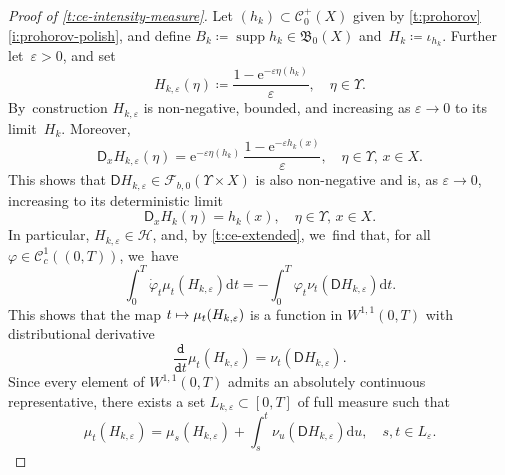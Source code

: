 \documentclass[10pt]{amsart}
\newcommand\mto{\mathchoice{\longmapsto}{\mapsto}{\mapsto}{\mapsto}}
\theoremstyle{definition}
\theoremstyle{remark}
\begin{document}
\begin{proof}[Proof of \cref{t:ce-intensity-measure}]
Let $(h_{k}) \subset \mathscr{C}_{0}^+(X)$ given by \cref{t:prohorov}\,\cref{i:prohorov-polish}, and define $B_k\coloneq \operatorname{supp} h_k\in \mathfrak{B}_0(X)$ and~$H_{k} \coloneq \iota_{h_{k}}$.
Further let~$\varepsilon > 0$, and set
\begin{equation*}
H_{k,\varepsilon}(\eta) \coloneq \frac{1 - \mathrm{e}^{-\varepsilon \eta(h_{k})}}{\varepsilon}, \quad \eta \in \varUpsilon.
\end{equation*}
By~construction $H_{k,\varepsilon}$ is non-negative, bounded, and increasing as $\varepsilon \to 0$ to its limit~$H_{k}$.
Moreover,
\begin{equation}\label{eq:t:ce-intensity-measure:1}
\mathsf{D}_{x} H_{k,\varepsilon}(\eta) = \mathrm{e}^{-\varepsilon \eta(h_k)}\, \frac{1-\mathrm{e}^{-\varepsilon h_{k}(x)}}{\varepsilon}, \quad \eta \in \varUpsilon,\, x \in X.
\end{equation}
This shows that $\mathsf{D} H_{k,\varepsilon} \in \mathscr{F}_{b,0}(\varUpsilon \times X)$ is also non-negative and is, as $\varepsilon \to 0$, increasing to its deterministic limit
\begin{equation*}
\mathsf{D}_{x} H_{k}(\eta) = h_{k}(x), \quad \eta \in \varUpsilon,\, x \in X.
\end{equation*}
In particular, $H_{k,\varepsilon} \in \mathscr{H}$, and, by \cref{t:ce-extended}, we~find that, for all $\varphi \in \mathscr{C}_{c}^{1}((0,T))$, we~have
\begin{equation*}
\int_{0}^{T} \dot{\varphi}_{t} \mu_{t}(H_{k,\varepsilon}) \mathrm{d} t = - \int_{0}^{T} \varphi_{t} \nu_{t}(\mathsf{D} H_{k,\varepsilon}) \mathrm{d} t .
\end{equation*}
This shows that the map $t \mto \mu_{t}(H_{k,\varepsilon})$ is a function in $W^{1,1}(0,T)$ with distributional derivative
\begin{equation*}
\frac{\mathtt{d}}{\mathtt{d} t} \mu_{t}(H_{k,\varepsilon}) = \nu_{t}(\mathsf{D} H_{k,\varepsilon}) .
\end{equation*}
Since every element of $W^{1,1}(0,T)$ admits an absolutely continuous representative, there exists a set $L_{k,\varepsilon} \subset [0,T]$ of full measure such that
\begin{equation}\label{e:ce-g-epsilon}
\mu_{t}(H_{k,\varepsilon}) = \mu_{s}(H_{k,\varepsilon}) + \int_{s}^{t} \nu_{u}(\mathsf{D} H_{k,\varepsilon}) \mathrm{d} u, \quad s,t \in L_{\varepsilon}.
\end{equation}

\end{proof}
\end{document}
